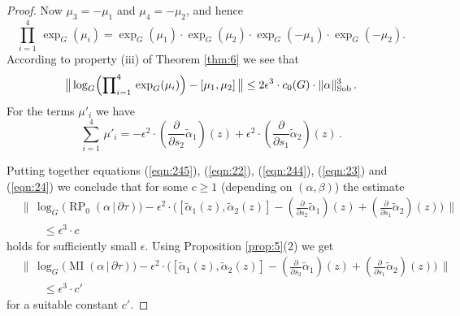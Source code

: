 \documentclass[10pt, a4paper]{amsart}
\theoremstyle{definition}
\numberwithin{equation}{section}
\newcommand{\opn}{\operatorname}
\newcommand{\mrm}[1]{\mathrm{#1}}
\newcommand{\smfrac}[2]{{\textstyle \frac{#1}{#2}}}
\newcommand{\boprod}{\prod\nolimits}
\newcommand{\til}[1]{\tilde{#1}}
\newcommand{\norm}[1]{\lVert #1 \rVert}
\newcommand{\Norm}[1]{\bigl\lVert\, #1 \, \bigr\rVert}
\renewcommand{\vert}{\, | \,}
\begin{document}
\begin{proof}
Now
$\mu_3 = -\mu_1$ and $\mu_4 = - \mu_2$, and hence
\[ \prod_{i = 1}^{4} \, \exp_G(\mu_i)  = 
\exp_G(\mu_1) \cdot \exp_G(\mu_2) \cdot \exp_G(- \mu_1) \cdot 
\exp_G(- \mu_2) . \]
According to property (iii) of Theorem \ref{thm:6} we see that
\begin{equation} \label{eqn:23}
\Norm{ \log_G \Bigl( \boprod_{i = 1}^{4} \, \exp_G(\mu_i) \Bigr)
- [\mu_1, \mu_2] }
\leq 2 \epsilon^3 \cdot c_0(G) \cdot \norm{\alpha}_{\mrm{Sob}}^3 \, .
\end{equation}
For the terms $\mu'_i$ we have
\begin{equation} \label{eqn:24}
\sum_{i = 1}^{4} \, \mu'_i = 
- \epsilon^2 \cdot (\smfrac{\partial}{\partial s_2} \til{\alpha}_1)(z) +
\epsilon^2 \cdot (\smfrac{\partial}{\partial s_1} \til{\alpha}_2) (z) \, . 
\end{equation}

Putting together equations (\ref{eqn:245}), (\ref{eqn:22}),
(\ref{eqn:244}), (\ref{eqn:23}) and (\ref{eqn:24})  
we conclude that for some 
$c \geq 1$ (depending on $(\alpha, \beta)$) the estimate
\[ \begin{aligned}
& \Norm{ \log_G \bigl( \opn{RP}_{0}(\alpha \vert \partial \tau) \bigr)
- \epsilon^2 \cdot \bigl(  [\til{\alpha}_1(z), \til{\alpha}_2(z)]  
- (\smfrac{\partial}{\partial s_2} \til{\alpha}_1)(z) +
(\smfrac{\partial}{\partial s_1} \til{\alpha}_2)(z) \bigr) } \\
& \qquad \leq \epsilon^3 \cdot c  
\end{aligned} \]
holds for sufficiently small $\epsilon$. 
Using Proposition \ref{prop:5}(2) we get
\begin{equation} \label{eqn:26}
\begin{aligned}
& \Norm{ \log_G \bigl( \opn{MI}(\alpha \vert \partial \tau) \bigr)
- \epsilon^2 \cdot \bigl(  [\til{\alpha}_1(z), \til{\alpha}_2(z)]  
- (\smfrac{\partial}{\partial s_2} \til{\alpha}_1)(z) +
(\smfrac{\partial}{\partial s_1} \til{\alpha}_2)(z) \bigr)  } \\
& \qquad \leq \epsilon^3 \cdot c' 
\end{aligned}
\end{equation}
for a suitable constant $c'$. 


\end{proof}
\end{document}
